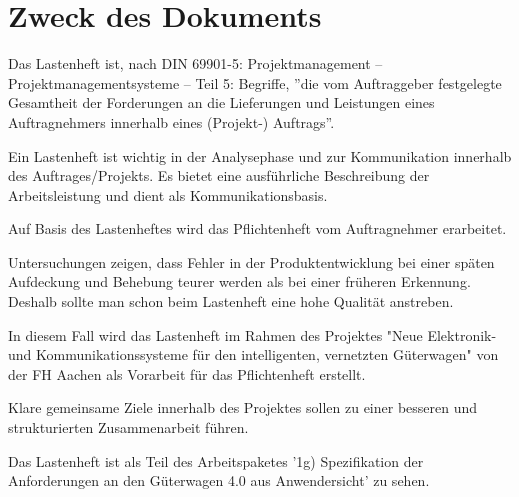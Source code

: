 \section*{Zweck des Dokuments}
Das Lastenheft ist, nach \acrshort{DIN} 69901-5: Projektmanagement – Projektmanagementsysteme – Teil 5: Begriffe, ''die vom Auftraggeber festgelegte Gesamtheit der Forderungen an die Lieferungen und Leistungen eines Auftragnehmers innerhalb eines (Projekt-) Auftrags''\cite{DIN69901-5}.\par
Ein Lastenheft ist wichtig in der Analysephase und zur Kommunikation innerhalb des Auftrages/Projekts. Es bietet eine ausführliche Beschreibung der Arbeitsleistung und dient als Kommunikationsbasis.\par
Auf Basis des Lastenheftes wird das Pflichtenheft vom Auftragnehmer erarbeitet.\par
Untersuchungen zeigen, dass Fehler in der Produktentwicklung bei einer späten Aufdeckung und Behebung teurer werden als bei einer früheren Erkennung. Deshalb sollte man schon beim Lastenheft eine hohe Qualität anstreben.\cite{pmblog}\par
In diesem Fall wird das Lastenheft im Rahmen des Projektes "Neue Elektronik- und Kommunikationssysteme für den intelligenten, vernetzten Güterwagen" von der FH Aachen als Vorarbeit für das Pflichtenheft erstellt. \par
Klare gemeinsame Ziele innerhalb des Projektes sollen zu einer besseren und strukturierten Zusammenarbeit führen.\par
Das Lastenheft ist als Teil des Arbeitspaketes '1g) Spezifikation der Anforderungen an den Güterwagen 4.0 aus Anwendersicht' zu sehen.